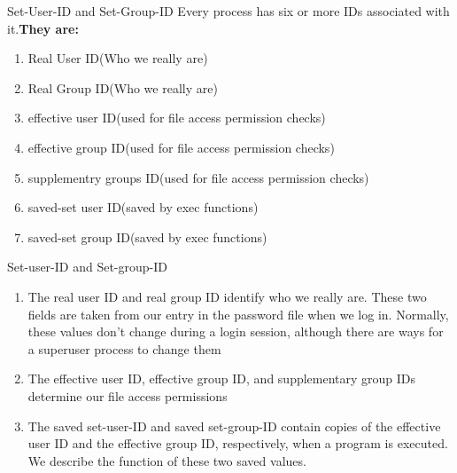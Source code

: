 \documentclass{beamer}
\begin{document}
  
  \begin{frame}[t]{ Set-User-ID and Set-Group-ID}\vspace*{4pt}
  Every process has six or more IDs associated with it.\textbf{They are:}
  \begin{enumerate}
  	
  	\item Real User ID(Who we really are)
  	\item Real Group ID(Who  we really are)
  	\item effective user ID(used for file access permission checks)
  	\item effective group ID(used for file access permission checks)
  	\item supplementry groups ID(used for file access permission checks)
  	\item saved-set user ID(saved by exec functions)
  	\item saved-set group ID(saved by exec functions)
  	
  \end{enumerate}






\end{frame} 
\begin{frame}[t]{Set-user-ID and Set-group-ID}
\begin{enumerate}
	\item The real user ID and real group ID identify who we really are. These two fields
	are taken from our entry in the password file when we log in. Normally, these
	values don’t change during a login session, although there are ways for a
	superuser process to change them
	\item The effective user ID, effective group ID, and supplementary group IDs
	determine our file access permissions
	\item The saved set-user-ID and saved set-group-ID contain copies of the effective
	user ID and the effective group ID, respectively, when a program is executed.
	We describe the function of these two saved values.
\end{enumerate}

\end{frame}
\end{document}
